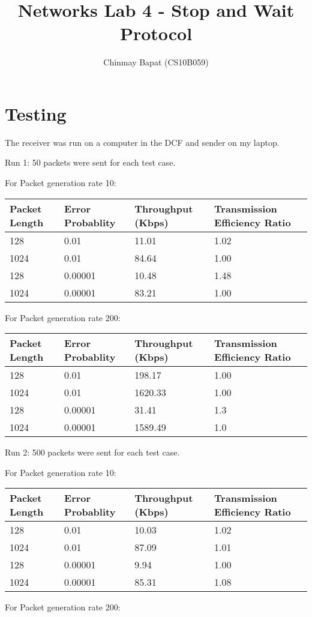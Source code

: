 \documentclass[11pt]{article}
\author{Chinmay Bapat (CS10B059)}
\title{Networks Lab 4 - Stop and Wait Protocol}
\begin{document}
\maketitle
\section{Testing}
The receiver was run on a computer in the DCF and sender on my laptop.

Run 1:
50 packets were sent for each test case.


For Packet generation rate 10:

\begin{tabular} {l l l l }
Packet Length & Error Probablity & Throughput (Kbps) & Transmission Efficiency Ratio\\ \hline
128 & 0.01 & 11.01 & 1.02\\
1024 & 0.01 & 84.64 & 1.00\\
128 & 0.00001 & 10.48 & 1.48\\
1024 & 0.00001 & 83.21 & 1.00\\
\end{tabular}


For Packet generation rate 200:

\begin{tabular} {l l l l }
Packet Length & Error Probablity & Throughput (Kbps) & Transmission Efficiency Ratio\\ \hline
128 & 0.01 & 198.17 & 1.00\\
1024 & 0.01 & 1620.33 & 1.00\\
128 & 0.00001 & 31.41 & 1.3\\
1024 & 0.00001 & 1589.49 & 1.0\\
\end{tabular}


Run 2:
500 packets were sent for each test case.

For Packet generation rate 10:

\begin{tabular} {l l l l }
Packet Length & Error Probablity & Throughput (Kbps) & Transmission Efficiency Ratio\\ \hline
128 & 0.01 &     10.03 & 1.02\\
1024 & 0.01 &    87.09 & 1.01\\
128 & 0.00001 &  9.94 & 1.00\\
1024 & 0.00001 & 85.31 & 1.08\\
\end{tabular}


For Packet generation rate 200:
\end{document}
